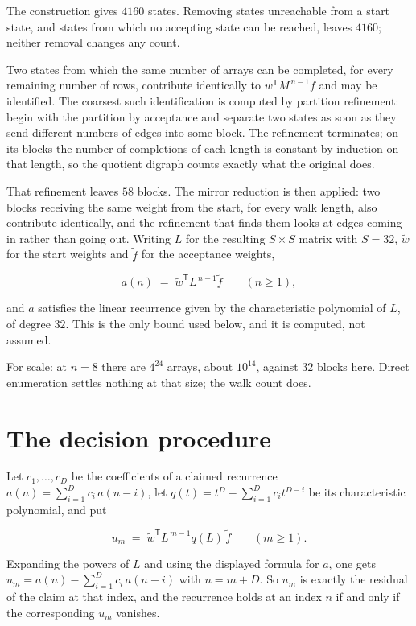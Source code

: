 \documentclass[11pt]{article}
\theoremstyle{definition}
\begin{document}
The construction gives $4160$ states. Removing states unreachable from a start state, and states from which no accepting state can be reached, leaves $4160$; neither removal changes any count.

Two states from which the same number of arrays can be completed, for every remaining number of rows, contribute identically to $w^{\mathsf T}M^{\,n-1}f$ and may be identified. The coarsest such identification is computed by partition refinement: begin with the partition by acceptance and separate two states as soon as they send different numbers of edges into some block. The refinement terminates; on its blocks the number of completions of each length is constant by induction on that length, so the quotient digraph counts exactly what the original does.

That refinement leaves $58$ blocks. The mirror reduction is then applied: two blocks receiving the same weight from the start, for every walk length, also contribute identically, and the refinement that finds them looks at edges coming in rather than going out. Writing $L$ for the resulting $S \times S$ matrix with $S = 32$, $\tilde w$ for the start weights and $\tilde f$ for the acceptance weights,

\[a(n) \;=\; \tilde w^{\mathsf T} L^{\,n-1} \tilde f \qquad (n \ge 1),\]

and $a$ satisfies the linear recurrence given by the characteristic polynomial of $L$, of degree $32$. This is the only bound used below, and it is computed, not assumed.

For scale: at $n = 8$ there are $4^{24}$ arrays, about $10^{14}$, against $32$ blocks here. Direct enumeration settles nothing at that size; the walk count does.

\section{The decision procedure}

Let $c_1,\dots,c_D$ be the coefficients of a claimed recurrence $a(n) = \sum_{i=1}^{D} c_i\,a(n-i)$, let $q(t) = t^{D} - \sum_{i=1}^{D} c_i t^{D-i}$ be its characteristic polynomial, and put

\[u_m \;=\; \tilde w^{\mathsf T} L^{\,m-1} q(L)\,\tilde f \qquad (m \ge 1).\]

Expanding the powers of $L$ and using the displayed formula for $a$, one gets $u_m = a(n) - \sum_{i=1}^{D} c_i\,a(n-i)$ with $n = m + D$. So $u_m$ is exactly the residual of the claim at that index, and the recurrence holds at an index $n$ if and only if the corresponding $u_m$ vanishes.
\end{document}
